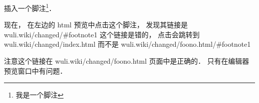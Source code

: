 
插入一个脚注\footnote{我是一个脚注}．

现在， 在左边的 html 预览中点击这个脚注， 发现其链接是 wuli.wiki/changed/#footnote1 这个链接是错的， 点击会跳转到 wuli.wiki/changed/index.html 而不是 wuli.wiki/changed/foono.html/#footnote1

注意这个链接在 wuli.wiki/changed/foono.html 页面中是正确的． 只有在编辑器预览窗口中有问题．
